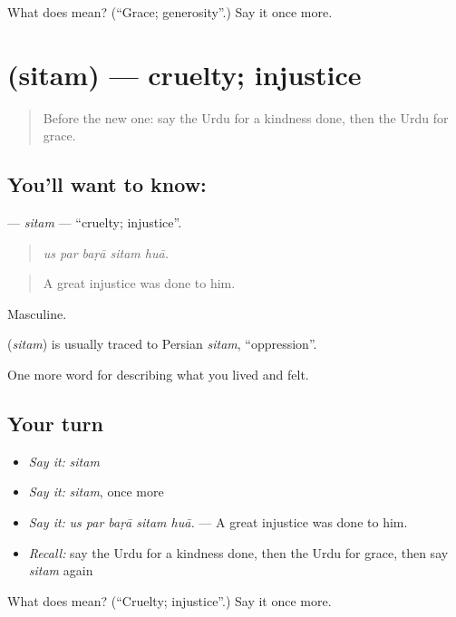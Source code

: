 \begin{tcolorbox}[breakable,colback=teal!4,colframe=teal!35!black,title={Before you move on}]
What does  mean? (\textquotedblleft{}Grace; generosity\textquotedblright{}.) Say it once more.
\end{tcolorbox}
\section[\texorpdfstring{\ur{ستم} (sitam)}{ستم (sitam)}]{ (sitam) — cruelty; injustice}

\label{lesson:UR-C456-sitam}



\begin{quote}
Before the new one: say the Urdu for a kindness done, then the Urdu for grace.
\end{quote}

\subsection*{You'll want to know: }
\textbf{} — \emph{sitam} — \textquotedblleft{}cruelty; injustice\textquotedblright{}.

\begin{quote}
    
\end{quote}

\begin{quote}
\emph{us par baṛā sitam huā.}
\end{quote}

\begin{quote}
A great injustice was done to him.
\end{quote}

Masculine.

\begin{cousinweb}
\textbf{} (\emph{sitam}) is usually traced to Persian \emph{sitam}, \textquotedblleft{}oppression\textquotedblright{}.
\end{cousinweb}

\begin{grammarlens}[title={What you've built}]
One more word for describing what you lived and felt.
\end{grammarlens}

\subsection*{Your turn}
\begin{itemize}
\raggedright
  \item \emph{Say it:} \emph{sitam}
  \item \emph{Say it:} \emph{sitam}, once more
  \item \emph{Say it:} \emph{us par baṛā sitam huā.} — A great injustice was done to him.
  \item \emph{Recall:} say the Urdu for a kindness done, then the Urdu for grace, then say \emph{sitam} again
\end{itemize}

\begin{tcolorbox}[breakable,colback=teal!4,colframe=teal!35!black,title={Before you move on}]
What does  mean? (\textquotedblleft{}Cruelty; injustice\textquotedblright{}.) Say it once more.
\end{tcolorbox}
